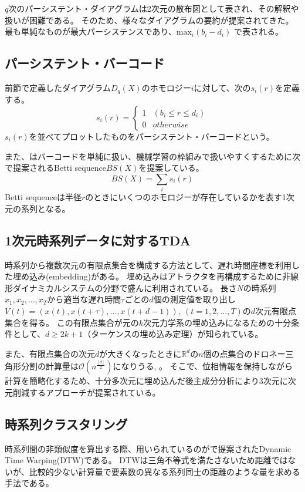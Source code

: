 \documentclass{jarticle}
\begin{document}
$q$次のパーシステント・ダイアグラムは2次元の散布図として表され、その解釈や扱いが困難である。
そのため、様々なダイアグラムの要約が提案されてきた。
最も単純なものが最大パーシステンスであり、$\text{max}_i(b_i - d_i)$
で表される。

\subsection{パーシステント・バーコード}
前節で定義したダイアグラム$D_q(X)$のホモロジー$i$に対して、次の$s_i(r)$を定義する。
$$
s_i(r) = 
\begin{cases}
1 & (b_i \leq r \leq d_i)\\
0 & otherwise
\end{cases}
$$
$s_i(r)$を並べてプロットしたものをパーシステント・バーコードという。

また、\cite{Umeda2017}はバーコードを単純に扱い、機械学習の枠組みで扱いやすくするために次で提案されるBetti sequence$BS(X)$を提案している。
$$
BS(X) = \sum_i s_i(r)
$$
Betti sequenceは半径$r$のときにいくつのホモロジーが存在しているかを表す1次元の系列となる。

\subsection{1次元時系列データに対するTDA}
時系列から複数次元の有限点集合を構成する方法として、遅れ時間座標を利用した埋め込み(embedding)がある。
埋め込みはアトラクタを再構成するために非線形ダイナミカルシステムの分野で盛んに利用されている。
長さ$N$の時系列$x_1, x_2, \dots , x_T$から適当な遅れ時間$\tau$ごとの$d$個の測定値を取り出し$V(t) = (x(t), x(t+\tau), \dots, x(t + d - 1)),\ (t = 1,2,\dots, T)$の$d$次元有限点集合を得る。
この有限点集合が元の$k$次元力学系の埋め込みになるための十分条件として、$d\geq 2k+1$（ターケンスの埋め込み定理）が知られている。

また、有限点集合の次元$d$が大きくなったときに$\mathbb R^d$の$n$個の点集合のドロネー三角形分割の計算量は$\mathcal O(n^{\frac{[d]}{2}})$になりうる\cite{Amenta2007}, \cite{Attali2003}。
そこで、位相情報を保持しながら計算を簡略化するため、十分多次元に埋め込んだ後主成分分析により3次元に次元削減するアプローチが提案されている\cite{Truong2017}。


\subsection{時系列クラスタリング}
時系列間の非類似度を算出する際、用いられているのが\cite{Berndt1996}で提案されたDynamic Time Warping(DTW)である。
DTWは三角不等式を満たさないため距離ではないが、比較的少ない計算量で要素数の異なる系列同士の距離のような量を求める手法である。
\end{document}
